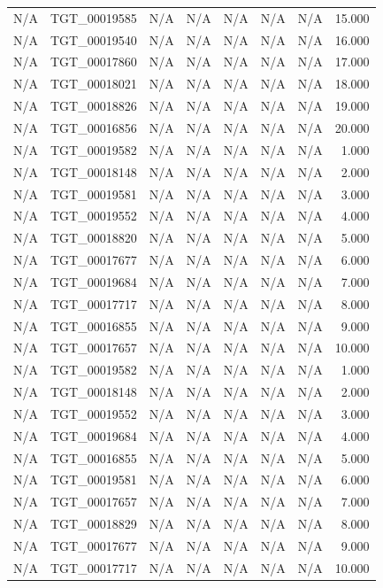 \begin{table}[h!]
\begin{tabular}{lrrrrrrr}
N/A & TGT\_00019585 & N/A & N/A & N/A & N/A & N/A & 15.000 \\
N/A & TGT\_00019540 & N/A & N/A & N/A & N/A & N/A & 16.000 \\
N/A & TGT\_00017860 & N/A & N/A & N/A & N/A & N/A & 17.000 \\
N/A & TGT\_00018021 & N/A & N/A & N/A & N/A & N/A & 18.000 \\
N/A & TGT\_00018826 & N/A & N/A & N/A & N/A & N/A & 19.000 \\
N/A & TGT\_00016856 & N/A & N/A & N/A & N/A & N/A & 20.000 \\
N/A & TGT\_00019582 & N/A & N/A & N/A & N/A & N/A & 1.000 \\
N/A & TGT\_00018148 & N/A & N/A & N/A & N/A & N/A & 2.000 \\
N/A & TGT\_00019581 & N/A & N/A & N/A & N/A & N/A & 3.000 \\
N/A & TGT\_00019552 & N/A & N/A & N/A & N/A & N/A & 4.000 \\
N/A & TGT\_00018820 & N/A & N/A & N/A & N/A & N/A & 5.000 \\
N/A & TGT\_00017677 & N/A & N/A & N/A & N/A & N/A & 6.000 \\
N/A & TGT\_00019684 & N/A & N/A & N/A & N/A & N/A & 7.000 \\
N/A & TGT\_00017717 & N/A & N/A & N/A & N/A & N/A & 8.000 \\
N/A & TGT\_00016855 & N/A & N/A & N/A & N/A & N/A & 9.000 \\
N/A & TGT\_00017657 & N/A & N/A & N/A & N/A & N/A & 10.000 \\
N/A & TGT\_00019582 & N/A & N/A & N/A & N/A & N/A & 1.000 \\
N/A & TGT\_00018148 & N/A & N/A & N/A & N/A & N/A & 2.000 \\
N/A & TGT\_00019552 & N/A & N/A & N/A & N/A & N/A & 3.000 \\
N/A & TGT\_00019684 & N/A & N/A & N/A & N/A & N/A & 4.000 \\
N/A & TGT\_00016855 & N/A & N/A & N/A & N/A & N/A & 5.000 \\
N/A & TGT\_00019581 & N/A & N/A & N/A & N/A & N/A & 6.000 \\
N/A & TGT\_00017657 & N/A & N/A & N/A & N/A & N/A & 7.000 \\
N/A & TGT\_00018829 & N/A & N/A & N/A & N/A & N/A & 8.000 \\
N/A & TGT\_00017677 & N/A & N/A & N/A & N/A & N/A & 9.000 \\
N/A & TGT\_00017717 & N/A & N/A & N/A & N/A & N/A & 10.000 \\

\end{tabular}
\end{table}

